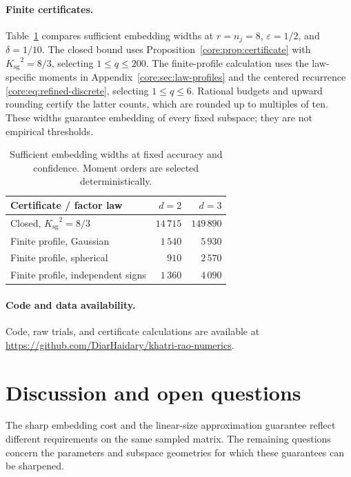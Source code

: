 \documentclass[11pt,a4paper]{article}
\theoremstyle{definition}\newtheorem{definition}[theorem]{Definition}
\theoremstyle{remark}\newtheorem{remark}[theorem]{Remark}
\numberwithin{equation}{section}
\newcommand{\Ksg}{{K_{\mathrm{sg}}}}\newcommand{\Cfour}{{C_4}}
\begin{document}
\paragraph{Finite certificates.}
Table~\ref{tab:current-certificates} compares sufficient embedding widths
at $r=n_j=8$, $\varepsilon=1/2$, and $\delta=1/10$.
The closed bound uses Proposition~\ref{core:prop:certificate} with
$\Ksg^2=8/3$, selecting $1\le q\le200$.
The finite-profile calculation uses the law-specific moments in
Appendix~\ref{core:sec:law-profiles} and the centered recurrence
\eqref{core:eq:refined-discrete}, selecting $1\le q\le6$.
Rational budgets and upward rounding certify the latter counts, which
are rounded up to multiples of ten. These widths guarantee embedding
of every fixed subspace; they are not empirical thresholds.

\begin{table}[htbp]
\centering\small
\renewcommand{\arraystretch}{1.15}
\begin{tabular}{@{}lrr@{}}
\toprule
Certificate / factor law & $d=2$ & $d=3$\\
\midrule
Closed, $\Ksg^2=8/3$ & $14\,715$ & $149\,890$\\
Finite profile, Gaussian & $1\,540$ & $5\,930$\\
Finite profile, spherical & $910$ & $2\,570$\\
Finite profile, independent signs & $1\,360$ & $4\,090$\\
\bottomrule
\end{tabular}
\caption{Sufficient embedding widths at fixed accuracy and confidence.
Moment orders are selected deterministically.}
\label{tab:current-certificates}
\end{table}

\paragraph{Code and data availability.}
Code, raw trials, and certificate calculations are available at
\url{https://github.com/DiarHaidary/khatri-rao-numerics}.

\FloatBarrier


\section{Discussion and open questions}\label{sec:discussion}
The sharp embedding cost and the linear-size approximation guarantee
reflect different requirements on the same sampled matrix. The
remaining questions concern the parameters and subspace geometries
for which these guarantees can be sharpened.
\end{document}
